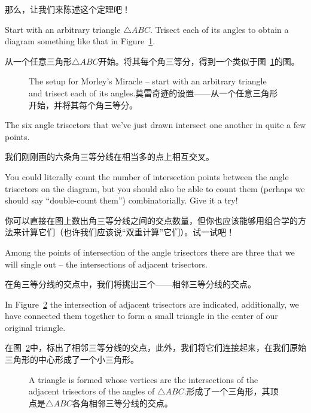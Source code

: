 那么，让我们来陈述这个定理吧！

Start with an arbitrary triangle ${\triangle}ABC$.  Trisect each of its angles
to obtain a diagram something like that in Figure~\ref{fig:morley_setup}.

从一个任意三角形${\triangle}ABC$开始。将其每个角三等分，得到一个类似于图~\ref{fig:morley_setup}的图。

\begin{figure}[!hbtp] 
\begin{center}

\end{center}
\caption[The setup for Morley's Miracle.莫雷奇迹的设置。]{The setup for Morley's %
Miracle -- start with an arbitrary triangle and trisect each of %
its angles.莫雷奇迹的设置——从一个任意三角形开始，并将其每个角三等分。}
\label{fig:morley_setup}
\end{figure}
 
The six angle trisectors that we've just drawn intersect one another
in quite a few points.

我们刚刚画的六条角三等分线在相当多的点上相互交叉。

\begin{exer}
You could literally count the number of intersection points between the
angle trisectors on the diagram, but you should also be able to count them
(perhaps we should say ``double-count them'') combinatorially.
Give it 
a try!
\end{exer}

\begin{exer}
你可以直接在图上数出角三等分线之间的交点数量，但你也应该能够用组合学的方法来计算它们（也许我们应该说“双重计算”它们）。试一试吧！
\end{exer}

Among the points of intersection of the angle trisectors there are three
that we will single out -- the intersections of adjacent trisectors.

在角三等分线的交点中，我们将挑出三个——相邻三等分线的交点。

In Figure~\ref{fig:morley_1st_triangle} the intersection of adjacent trisectors
are indicated, additionally, we have connected them together to form a 
small triangle in the center of our original triangle.

在图~\ref{fig:morley_1st_triangle}中，标出了相邻三等分线的交点，此外，我们将它们连接起来，在我们原始三角形的中心形成了一个小三角形。

\clearpage

\begin{figure}[!hbtp] 
\begin{center}

\end{center}
\caption[The first Morley triangle.第一个莫雷三角形。]{A triangle is formed whose vertices %
are the intersections of the adjacent trisectors of the angles of %
${\triangle}ABC$.形成了一个三角形，其顶点是${\triangle}ABC$各角相邻三等分线的交点。}
\label{fig:morley_1st_triangle}
\end{figure}
  


